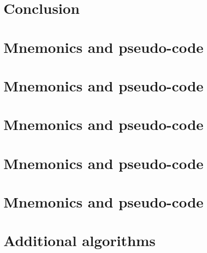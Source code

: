 \documentclass[preprint]{iacrtrans}
\begin{document}

\section{Conclusion}
\label{sec:outro}



%






\appendix

\newpage
\section{ Mnemonics and pseudo-code}
\label{sec:pseudo:v1}


\newpage
\section{ Mnemonics and pseudo-code}
\label{sec:pseudo:v2}


\newpage
\section{ Mnemonics and pseudo-code}
\label{sec:pseudo:v3}


\newpage
\section{ Mnemonics and pseudo-code}
\label{sec:pseudo:v4}


\newpage
\section{ Mnemonics and pseudo-code}
\label{sec:pseudo:v5}


\newpage
\section{Additional algorithms}
\label{sec:alg}


\end{document}
